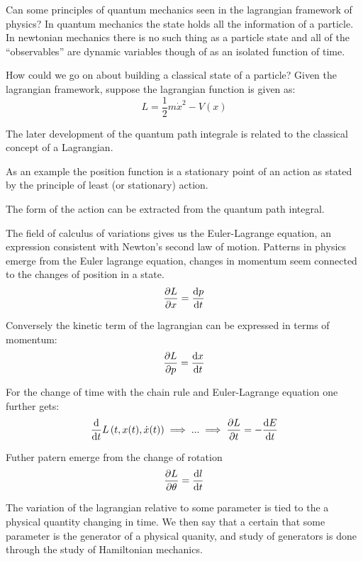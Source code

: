 \begin{multicols}{3}
  Can some principles of quantum mechanics seen in the lagrangian framework of physics?
  In quantum mechanics the state holds all the information of a particle.
  In newtonian mechanics there is no such thing as a particle state and all of the ``observables'' are
  dynamic variables though of as an isolated function of time.

  How could we go on about building a classical state of a particle?
  Given the lagrangian framework, suppose the lagrangian function is given as:
  \begin{equation*}
    L = \frac{1}{2}m \dot{x}^2 - V(x)
  \end{equation*}

  The later development of the quantum path integrale is related to the classical concept of a Lagrangian.

  As an example the position function is a stationary point of an action as stated by the principle of least (or stationary) action.

  The form of the action can be extracted from the quantum path integral.

  The field of calculus of variations gives us the Euler-Lagrange equation, an expression consistent with Newton's second law of motion.
  Patterns in physics emerge from the Euler lagrange equation,
  changes in momentum seem connected to the changes of position in a state.
  \begin{equation*}
    \pdv{L}{x} = \dv{p}{t}
  \end{equation*}

  Conversely the kinetic term of the lagrangian can be expressed in terms of momentum:
  \begin{equation*}
    \pdv{L}{p} = \dv{x}{t}
  \end{equation*}

  For the change of time with the chain rule and Euler-Lagrange equation one further gets:
  \begin{equation*}
    \dv{t} L\left(t, x(t), \dot{x}(t)\right) \implies
    ... \implies
    \pdv{L}{t} = -\dv{E}{t}
  \end{equation*}

  Futher patern emerge from the change of rotation
  \begin{equation*}
    \pdv{L}{\theta} = \dv{l}{t}
  \end{equation*}

  The variation of the lagrangian relative to some parameter is tied to the a physical quantity changing in time.
  We then say that a certain that some parameter is the generator of a physical quanity, and study of generators
  is done through the study of Hamiltonian mechanics.


\end{multicols}
